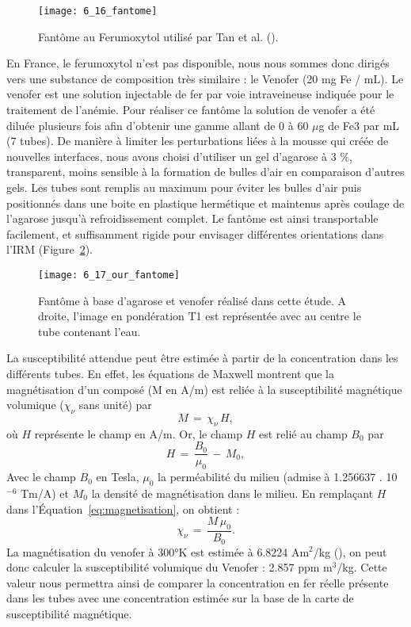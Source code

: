 {%
\begin{figure}[!t]
\centering
\texttt{[image: 6\_16\_fantome]}
\caption{Fantôme au Ferumoxytol utilisé par Tan et al. (\cite{tan2014}).}
\label{fig:6_16_fantome}	
\end{figure}
En France, le ferumoxytol n’est pas disponible, nous nous sommes donc dirigés vers une
substance de composition très similaire : le Venofer (20 mg Fe / mL). Le venofer est une solution
injectable de fer par voie intraveineuse indiquée pour le traitement de l'anémie. Pour réaliser ce
fantôme la solution de venofer a été diluée plusieurs fois afin d’obtenir une gamme allant de 0 à 60 $\mu$g
de Fe3 par mL (7 tubes). De manière à limiter les perturbations liées à la mousse qui créée de nouvelles
interfaces, nous avons choisi d’utiliser un gel d’agarose à 3 \%, transparent, moins sensible à la
formation de bulles d’air en comparaison d’autres gels. Les tubes sont remplis au maximum pour éviter
les bulles d’air puis positionnés dans une boite en plastique hermétique et maintenus après coulage
de l’agarose jusqu’à refroidissement complet. Le fantôme est ainsi transportable facilement, et
suffisamment rigide pour envisager différentes orientations dans l’IRM (Figure~\ref{fig:6_17_our_fantome}).
\begin{figure}[!t]
\centering
\texttt{[image: 6\_17\_our\_fantome]}
\caption{Fantôme à base d'agarose et venofer réalisé dans cette étude. A droite, l'image en pondération
T1 est représentée avec au centre le tube contenant l'eau.}
\label{fig:6_17_our_fantome}	
\end{figure}
La susceptibilité attendue peut être estimée à partir de la concentration dans les différents
tubes. En effet, les équations de Maxwell montrent que la magnétisation d’un composé (M en A/m)
est reliée à la susceptibilité magnétique volumique ($\chi_{\nu}$ sans unité) par
\begin{equation}
\label{eq:magnetisation}
M\,=\,\chi_{\nu}\,H,
\end{equation}
où $H$ représente le champ en A/m. Or, le champ $H$ est relié au champ $B_0$ par
\begin{equation}
H\,=\,\frac{B_0}{\mu_0}\,-\,M_0,
\end{equation}
Avec le champ $B_0$ en Tesla, $\mu_0$ la perméabilité du milieu (admise à 1.256637 . 10$^{-6}$ Tm/A) et $M_0$ la
densité de magnétisation dans le milieu. En remplaçant $H$ dans l’Équation~\ref{eq:magnetisation}, on obtient :
\begin{equation}
\chi_{\nu}\,=\,\frac{M\,\mu_0}{B_0}.
\end{equation}
La magnétisation du venofer à 300°K est estimée à 6.8224 Am$^2$/kg (\cite{Gutierrez2005}), on peut donc calculer la
susceptibilité volumique du Venofer : 2.857 ppm m$^3$/kg. Cette valeur nous permettra ainsi de comparer
la concentration en fer réelle présente dans les tubes avec une concentration estimée sur la base de
la carte de susceptibilité magnétique.

}
